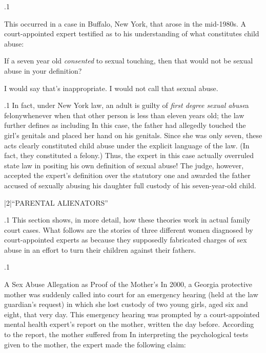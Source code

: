 \documentclass[11pt, twoside]{article}
\begin{document}
{\p.1{%
This occurred in a case in Buffalo, New York, that
arose in the mid-1980s. A court-appointed expert testified as to his understanding of
what constitutes child abuse:

\begin{docDescription}


 If a seven year old \textit{consented} to sexual touching, then that would not be sexual abuse in
your definition?

 I would say that’s inappropriate. I would
not call that sexual abuse.

\end{docDescription}

}%

\p.1{%
In fact, under New York law, an adult is guilty of \textit{first degree sexual
abuse}\mdash{}a felony\mdash{}whenever  when that other person is less than eleven years old; the
law further defines  as  including
 In this case, the father had allegedly touched the
girl’s genitals and placed her hand on his genitals. Since she was only
seven, these acts clearly constituted child abuse under the explicit language of the law. (In fact, they constituted a felony.) Thus, the expert in
this case actually overruled state law in positing his own definition of
sexual abuse! The judge, however, accepted the expert’s definition over
the statutory one and awarded the father accused of sexually abusing his
daughter full custody of his seven-year-old child.
}%


\s|2|{``PARENTAL ALIENATORS''}

\p.1{%
\noindent{}This section shows, in more detail, how these theories work in actual
family court cases. What follows are the stories of three different women
diagnosed by court-appointed experts as  because
they supposedly fabricated charges of sex abuse in an effort to turn their
children against their fathers.
}%

\p.1{%
A Sex Abuse Allegation as Proof of the Mother’s 
In 2000, a Georgia protective mother was suddenly called into court for
an emergency hearing (held at the law guardian’s request) in which she
lost custody of two young girls, aged six and eight, that very day. This
emergency hearing was prompted by a court-appointed mental health
expert’s report on the mother, written the day before. According to the
report, the mother suffered from  In interpreting the psychological tests given
to the mother, the expert made the following claim:

}}
\end{document}
